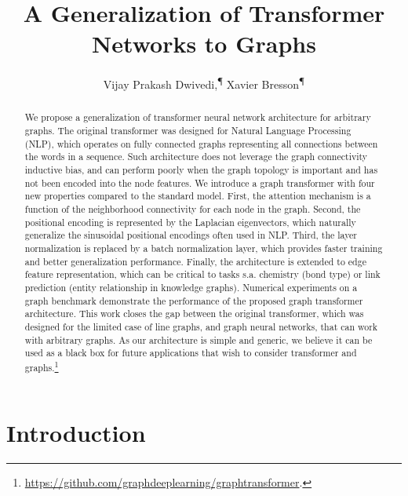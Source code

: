 \documentclass[letterpaper]{article} \usepackage{aaai21}  \usepackage{times}  \usepackage{helvet} \usepackage{courier}  \usepackage[hyphens]{url}  \usepackage{graphicx} \urlstyle{rm} \def\UrlFont{\rm}  \usepackage{natbib}  \usepackage{caption} \usepackage{xcolor}
\title{A Generalization of Transformer Networks to Graphs}
\author {
Vijay Prakash Dwivedi,\textsuperscript{\rm ¶} Xavier Bresson\textsuperscript{\rm ¶} \\
}
\begin{document}
\maketitle

\begin{abstract}

We propose a generalization of transformer neural network architecture for arbitrary graphs.
The original transformer was designed for Natural Language Processing (NLP), which operates on fully connected graphs representing all connections between the words in a sequence. Such architecture does not leverage the graph connectivity inductive bias, and can perform poorly when the graph topology is important and has not been encoded into the node features. 
We introduce a graph transformer with four new properties compared to the standard model. 
First, the attention mechanism is a function of the neighborhood connectivity for each node in the graph. Second, the positional encoding is represented by the Laplacian eigenvectors, which naturally generalize the sinusoidal positional encodings often used in NLP. 
Third, the layer normalization is replaced by a batch normalization layer, which provides faster training and better generalization performance.
Finally, the architecture is extended to edge feature representation, which can be critical to tasks s.a. chemistry (bond type) or link prediction (entity relationship in knowledge graphs).
Numerical experiments on a graph benchmark demonstrate the performance of the proposed graph transformer architecture. 
This work closes the gap between the original transformer, which was designed for the limited case of line graphs, and graph neural networks, that can work with arbitrary graphs. 
As our architecture is simple and generic, we believe it can be used as a black box for future applications that wish to consider transformer and graphs.\footnote{\url{https://github.com/graphdeeplearning/graphtransformer}.}



\end{abstract}


\section{Introduction}
\end{document}
